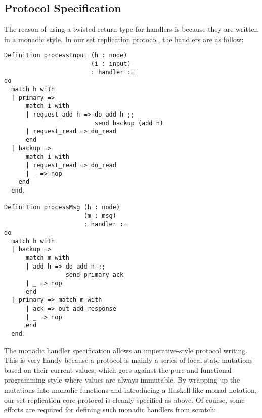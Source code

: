 \documentclass[twocolumn]{article}
\begin{document}
\subsection{Protocol Specification}
The reason of using a twisted return type for handlers is because they are
written in a monadic style. In our set replication protocol, the handlers are
as follow:
\begin{center}
\small
\begin{verbatim}
Definition processInput (h : node)
                        (i : input)
                        : handler :=
do
  match h with
  | primary =>
      match i with
      | request_add h => do_add h ;;
                         send backup (add h)
      | request_read => do_read
      end
  | backup =>
      match i with
      | request_read => do_read
      | _ => nop
    end
  end.

Definition processMsg (h : node)
                      (m : msg)
                      : handler :=
do
  match h with
  | backup =>
      match m with
      | add h => do_add h ;;
                 send primary ack
      | _ => nop
      end
  | primary => match m with
      | ack => out add_response
      | _ => nop
      end
  end.
\end{verbatim}
\end{center}
The monadic handler specification allows an imperative-style protocol writing.
This is very handy because a protocol is mainly a series of local state
mutations based on their current values, which goes against the pure and
functional programming style where values are always immutable. By wrapping up
the mutations into monadic functions and introducing a Haskell-like monad notation,
our set replication core protocol is cleanly specified as above.  Of course,
some efforts are required for defining such monadic handlers from scratch:
\end{document}
